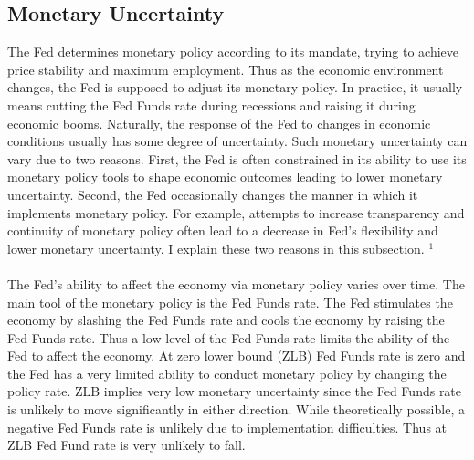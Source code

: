 \documentclass[12pt]{article}
\begin{document}
\subsection{Monetary Uncertainty} \label{sec:Model}

The Fed determines monetary policy according to its mandate, trying to achieve price stability and maximum employment. Thus as the economic environment changes, the Fed is supposed to adjust its monetary policy. In practice, it usually means cutting the Fed Funds rate during recessions and raising it during economic booms. Naturally, the response of the Fed to changes in economic conditions usually has some degree of uncertainty. Such monetary uncertainty can vary due to two reasons. First, the Fed is often constrained in its ability to use its monetary policy tools to shape economic outcomes leading to lower monetary uncertainty. Second, the Fed occasionally changes the manner in which it implements monetary policy. For example, attempts to increase transparency and continuity of monetary policy often lead to a decrease in Fed's flexibility and lower monetary uncertainty. I explain these two reasons in this subsection. $^1$
\paragraph{}
The Fed's ability to affect the economy via monetary policy varies over time. The main tool of the monetary policy is the Fed Funds rate. The Fed stimulates the economy by slashing the Fed Funds rate and cools the economy by raising the Fed Funds rate. Thus a low level of the Fed Funds rate limits the ability of the Fed to affect the economy. At zero lower bound (ZLB) Fed Funds rate is zero and the Fed has a very limited ability to conduct monetary policy by changing the policy rate. ZLB implies very low monetary uncertainty since the Fed Funds rate is unlikely to move significantly in either direction. While theoretically possible, a negative Fed Funds rate is unlikely due to implementation difficulties. Thus at ZLB Fed Fund rate is very unlikely to fall.
\end{document}
